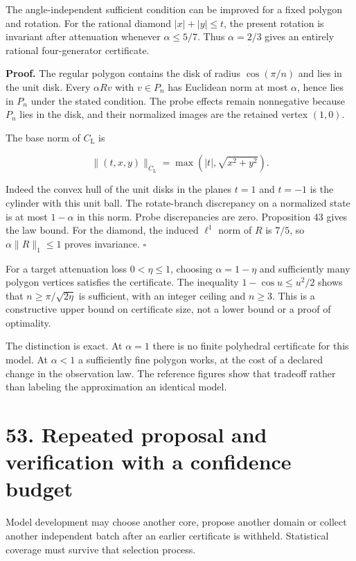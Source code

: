 \documentclass[11pt,letterpaper]{article}
\begin{document}
The angle-independent sufficient condition can be improved for a fixed
polygon and rotation. For the rational diamond \(|x|+|y|\leq t\), the
present rotation is invariant after attenuation whenever
\(\alpha\leq5/7\). Thus \(\alpha=2/3\) gives an entirely rational
four-generator certificate.

\textbf{Proof.} The regular polygon contains the disk of radius
\(\cos(\pi/n)\) and lies in the unit disk. Every \(\alpha Rv\) with
\(v\in P_n\) has Euclidean norm at most \(\alpha\), hence lies in
\(P_n\) under the stated condition. The probe effects remain nonnegative
because \(P_n\) lies in the disk, and their normalized images are the
retained vertex \((1,0)\).

The base norm of \(C_{\mathrm L}\) is

\[
\|(t,x,y)\|_{C_{\mathrm L}}=\max(|t|,\sqrt{x^2+y^2}).
\]

Indeed the convex hull of the unit disks in the planes \(t=1\) and
\(t=-1\) is the cylinder with this unit ball. The rotate-branch
discrepancy on a normalized state is at most \(1-\alpha\) in this norm.
Probe discrepancies are zero. Proposition 43 gives the law bound. For
the diamond, the induced \(\ell^1\) norm of \(R\) is \(7/5\), so
\(\alpha\|R\|_1\leq1\) proves invariance. \(\square\)

For a target attenuation loss \(0<\eta\leq1\), choosing
\(\alpha=1-\eta\) and sufficiently many polygon vertices satisfies the
certificate. The inequality \(1-\cos u\leq u^2/2\) shows that
\(n\geq\pi/\sqrt{2\eta}\) is sufficient, with an integer ceiling and
\(n\geq3\). This is a constructive upper bound on certificate size, not
a lower bound or a proof of optimality.

The distinction is exact. At \(\alpha=1\) there is no finite polyhedral
certificate for this model. At \(\alpha<1\) a sufficiently fine polygon
works, at the cost of a declared change in the observation law. The
reference figures show that tradeoff rather than labeling the
approximation an identical model.

\section{53. Repeated proposal and verification with a confidence
budget}\label{repeated-proposal-and-verification-with-a-confidence-budget}

Model development may choose another core, propose another domain or
collect another independent batch after an earlier certificate is
withheld. Statistical coverage must survive that selection process.
\end{document}
